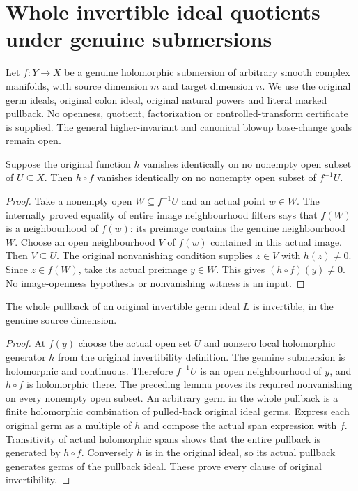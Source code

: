 \section{Whole invertible ideal quotients under genuine submersions}

Let $f:Y\to X$ be a genuine holomorphic submersion of arbitrary smooth complex manifolds, with source dimension $m$ and target dimension $n$. We use the original germ ideals, original colon ideal, original natural powers and literal marked pullback. No openness, quotient, factorization or controlled-transform certificate is supplied. The general higher-invariant and canonical blowup base-change goals remain open.

\begin{lemma}\label{hir:submersion-actual-nonzero-generator}
\leanok
Suppose the original function $h$ vanishes identically on no nonempty open subset of $U\subseteq X$. Then $h\circ f$ vanishes identically on no nonempty open subset of $f^{-1}U$.
\end{lemma}
\begin{proof}
Take a nonempty open $W\subseteq f^{-1}U$ and an actual point $w\in W$. The internally proved equality of entire image neighbourhood filters says that $f(W)$ is a neighbourhood of $f(w)$: its preimage contains the genuine neighbourhood $W$. Choose an open neighbourhood $V$ of $f(w)$ contained in this actual image. Then $V\subseteq U$. The original nonvanishing condition supplies $z\in V$ with $h(z)\ne0$. Since $z\in f(W)$, take its actual preimage $y\in W$. This gives $(h\circ f)(y)\ne0$. No image-openness hypothesis or nonvanishing witness is an input.
\end{proof}

\begin{theorem}\label{hir:submersion-actual-invertible-pullback}
\leanok
The whole pullback of an original invertible germ ideal $L$ is invertible, in the genuine source dimension.
\end{theorem}
\begin{proof}
At $f(y)$ choose the actual open set $U$ and nonzero local holomorphic generator $h$ from the original invertibility definition. The genuine submersion is holomorphic and continuous. Therefore $f^{-1}U$ is an open neighbourhood of $y$, and $h\circ f$ is holomorphic there. The preceding lemma proves its required nonvanishing on every nonempty open subset. An arbitrary germ in the whole pullback is a finite holomorphic combination of pulled-back original ideal germs. Express each original germ as a multiple of $h$ and compose the actual span expression with $f$. Transitivity of actual holomorphic spans shows that the entire pullback is generated by $h\circ f$. Conversely $h$ is in the original ideal, so its actual pullback generates germs of the pullback ideal. These prove every clause of original invertibility.
\end{proof}

